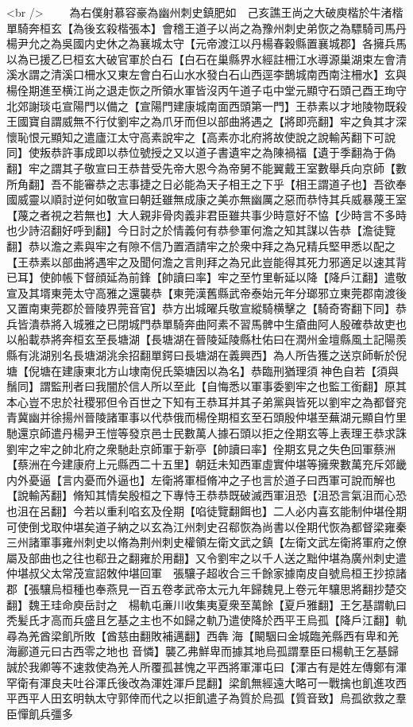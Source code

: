 <br />
　　為右僕射慕容豪為幽州刺史鎮肥如　己亥譙王尚之大破庾楷於牛渚楷單騎奔桓玄【為後玄殺楷張本】會稽王道子以尚之為豫州刺史弟恢之為驃騎司馬丹楊尹允之為吳國内史休之為襄城太守【元帝渡江以丹楊春穀縣置襄城郡】各擁兵馬以為已援乙巳桓玄大破官軍於白石【白石在巢縣界水經註柵江水導源巢湖束左會清溪水謂之清溪口柵水又東左會白石山水水發白石山西逕李鵲城南西南注柵水】玄與楊佺期進至横江尚之退走恢之所領水軍皆沒丙午道子屯中堂元顯守石頭己酉王珣守北郊謝琰屯宣陽門以備之【宣陽門建康城南面西頭第一門】王恭素以才地陵物既殺王國寶自謂威無不行仗劉牢之為爪牙而但以部曲將遇之【將即亮翻】牢之負其才深懷恥恨元顯知之遣廬江太守高素說牢之【高素亦北府將故使說之說輸芮翻下可說同】使叛恭許事成即以恭位號授之又以道子書遺牢之為陳禍福【遺于季翻為于偽翻】牢之謂其子敬宣曰王恭昔受先帝大恩今為帝舅不能翼戴王室數舉兵向京師【數所角翻】吾不能審恭之志事捷之日必能為天子相王之下乎【相王謂道子也】吾欲奉國威靈以順討逆何如敬宣曰朝廷雖無成康之美亦無幽厲之惡而恭恃其兵威暴蔑王室【蔑之者視之若無也】大人親非骨肉義非君臣雖共事少時意好不恊【少時言不多時也少詩沼翻好呼到翻】今日討之於情義何有恭參軍何澹之知其謀以告恭【澹徒覽翻】恭以澹之素與牢之有隙不信乃置酒請牢之於衆中拜之為兄精兵堅甲悉以配之【王恭素以部曲將遇牢之及聞何澹之言則拜之為兄此豈能得其死力邪適足以速其背已耳】使帥帳下督顔延為前鋒【帥讀曰率】牢之至竹里斬延以降【降戶江翻】遣敬宣及其壻東莞太守高雅之還襲恭【東莞漢舊縣武帝泰始元年分瑯邪立東莞郡南渡後又置南東莞郡於晉陵界莞音官】恭方出城曜兵敬宣縱騎横擊之【騎奇寄翻下同】恭兵皆潰恭將入城雅之已閉城門恭單騎奔曲阿素不習馬髀中生瘡曲阿人殷確恭故吏也以船載恭將奔桓玄至長塘湖【長塘湖在晉陵延陵縣杜佑曰在潤州金壇縣風土記陽羨縣有洮湖别名長塘湖洮余招翻單鍔曰長塘湖在義興西】為人所告獲之送京師斬於倪塘【倪塘在建康東北方山埭南倪氏築塘因以為名】恭臨刑猶理須神色自若【須與鬚同】謂監刑者曰我闇於信人所以至此【自悔悉以軍事委劉牢之也監工銜翻】原其本心豈不忠於社稷邪但令百世之下知有王恭耳并其子弟黨與皆死以劉牢之為都督兖青冀幽并徐揚州晉陵諸軍事以代恭俄而楊佺期桓玄至石頭殷仲堪至蕪湖元顯自竹里馳還京師遣丹楊尹王愷等發京邑士民數萬人據石頭以拒之佺期玄等上表理王恭求誅劉牢之牢之帥北府之衆馳赴京師軍于新亭【帥讀曰率】佺期玄見之失色回軍蔡洲【蔡洲在今建康府上元縣西二十五里】朝廷未知西軍虛實仲堪等擁衆數萬充斥郊畿内外憂逼【言内憂而外逼也】左衛將軍桓脩冲之子也言於道子曰西軍可說而解也【說輸芮翻】脩知其情矣殷桓之下專恃王恭恭既破滅西軍沮恐【沮恐言氣沮而心恐也沮在呂翻】今若以重利啗玄及佺期【啗徒覽翻餌也】二人必内喜玄能制仲堪佺期可使倒戈取仲堪矣道子納之以玄為江州刺史召郗恢為尚書以佺期代恢為都督梁雍秦三州諸軍事雍州刺史以脩為荆州刺史權領左衛文武之鎮【左衛文武左衛將軍府之僚屬及部曲也之往也郗丑之翻雍於用翻】又令劉牢之以千人送之黜仲堪為廣州刺史遣仲堪叔父太常茂宣詔敇仲堪回軍　張驤子超收合三千餘家據南皮自號烏桓王抄掠諸郡【張驤烏桓種也奉燕見一百五卷孝武帝太元九年歸魏見上卷元年驤思將翻抄楚交翻】魏王珪命庾岳討之　楊軌屯亷川收集夷夏衆至萬餘【夏戶雅翻】王乞基謂軌曰秃髪氏才高而兵盛且乞基之主也不如歸之軌乃遣使降於西平王烏孤【降戶江翻】軌尋為羌酋梁飢所敗【酋慈由翻敗補邁翻】西犇海【闞駰曰金城臨羌縣西有卑和羌海酈道元曰古西零之地也音憐】襲乙弗鮮卑而據其地烏孤謂羣臣曰楊軌王乞基歸誠於我卿等不速救使為羌人所覆孤甚愧之平西將軍渾屯曰【渾古有是姓左傳鄭有渾罕衛有渾良夫吐谷渾氏後改為渾姓渾戶昆翻】梁飢無經遠大略可一戰擒也飢進攻西平西平人田玄明執太守郭倖而代之以拒飢遣子為質於烏孤【質音致】烏孤欲救之羣臣憚飢兵彊多